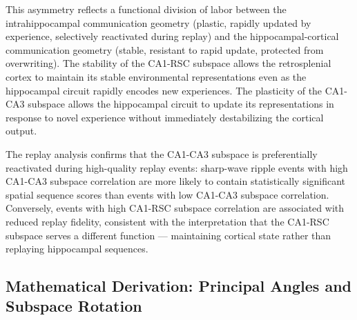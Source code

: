 \documentclass[12pt, a4paper, openany]{book}
\theoremstyle{definition}
\theoremstyle{remark}
\begin{document}
This asymmetry reflects a functional division of labor between the intrahippocampal communication geometry (plastic, rapidly updated by experience, selectively reactivated during replay) and the hippocampal-cortical communication geometry (stable, resistant to rapid update, protected from overwriting). The stability of the CA1-RSC subspace allows the retrosplenial cortex to maintain its stable environmental representations even as the hippocampal circuit rapidly encodes new experiences. The plasticity of the CA1-CA3 subspace allows the hippocampal circuit to update its representations in response to novel experience without immediately destabilizing the cortical output.

The replay analysis confirms that the CA1-CA3 subspace is preferentially reactivated during high-quality replay events: sharp-wave ripple events with high CA1-CA3 subspace correlation are more likely to contain statistically significant spatial sequence scores than events with low CA1-CA3 subspace correlation. Conversely, events with high CA1-RSC subspace correlation are associated with reduced replay fidelity, consistent with the interpretation that the CA1-RSC subspace serves a different function — maintaining cortical state rather than replaying hippocampal sequences.

\subsection*{Mathematical Derivation: Principal Angles and Subspace Rotation}
\end{document}
